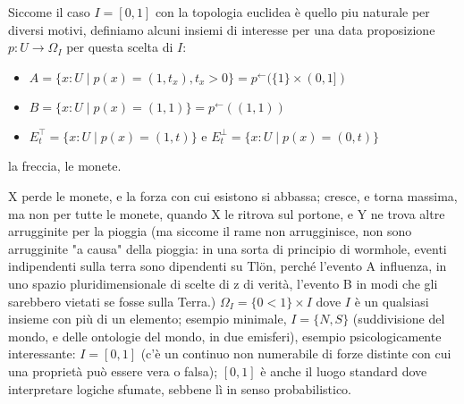 \documentclass{amsart}
\begin{document}
\begin{remark}
  Siccome il caso $I=[0,1]$ con la topologia euclidea è quello piu naturale per diversi motivi, definiamo alcuni insiemi di interesse per una data proposizione $p : U \to \Omega_I$ per questa scelta di $I$:
\begin{itemize}
  \item $A = \{x : U \mid p(x) = (1,t_x), t_x > 0\} = p^\leftarrow(\{1\}\times (0,1])$%
  \item $B = \{x : U \mid p(x) = (1,1)\} = p^\leftarrow((1,1))$%
  \item $E_t^\top = \{ x : U \mid p(x)=(1,t)\}$ e $E_t^\perp = \{ x : U \mid p(x)=(0,t)\}$%
\end{itemize}
\end{remark}
\begin{example}
  la freccia, le monete.

  X perde le monete, e la forza con cui esistono si abbassa; cresce, e torna massima, ma non per tutte le monete, quando X le ritrova sul portone,  e Y ne trova altre arrugginite per la pioggia (ma siccome il rame non arrugginisce, non sono arrugginite "a causa" della pioggia: in una sorta di principio di wormhole, eventi indipendenti sulla terra sono dipendenti su Tlön, perché l'evento A influenza, in uno spazio pluridimensionale di scelte di z di verità, l'evento B in modi che gli sarebbero vietati se fosse sulla Terra.) $\Omega_I = \{0<1\}\times I$ dove $I$ è un qualsiasi insieme con più di un elemento; esempio minimale, $I=\{N,S\}$ (suddivisione del mondo, e delle ontologie del mondo, in due emisferi), esempio psicologicamente interessante: $I=[0,1]$ (c'è un continuo non numerabile di forze distinte con cui una proprietà può essere vera o falsa); $[0,1]$ è anche il luogo standard dove interpretare logiche sfumate, sebbene lì in senso probabilistico.
\end{example}
\end{document}
